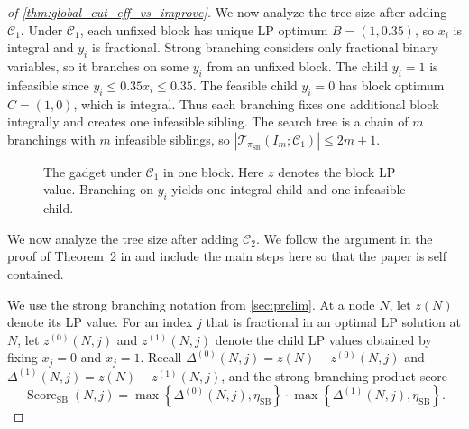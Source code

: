 \documentclass[smallextended,envcountsect]{svjour3} %
\newcommand{\set}[1]{\left\{#1\right\}}
\newcommand{\Tcal}{\mathcal{T}}
\newcommand{\Ccal}{\mathcal{C}}
\newcommand{\0}{\mathbf{0}}
\DeclareMathOperator{\Score}{Score} %
\newcommand{\1}{\mathbf{1}} %
\begin{document}
\begin{proof}[of \cref{thm:global_cut_eff_vs_improve}]
	We now analyze the tree size after adding $\Ccal_1$.
	Under $\Ccal_1$, each unfixed block has unique LP optimum $B=(1,0.35)$, so $x_i$ is integral and $y_i$ is fractional.
	Strong branching considers only fractional binary variables, so it branches on some $y_i$ from an unfixed block.
	The child $y_i=1$ is infeasible since $y_i\le 0.35x_i\le 0.35$.
	The feasible child $y_i=0$ has block optimum $C=(1,0)$, which is integral.
	Thus each branching fixes one additional block integrally and creates one infeasible sibling.
	The search tree is a chain of $m$ branchings with $m$ infeasible siblings, so $|\Tcal_{\pi_{\mathrm{SB}}}(I_m;\Ccal_1)|\le 2m+1$.

	\begin{figure}[htbp]
		\centering
			\caption{The gadget under $\Ccal_1$ in one block. Here $z$ denotes the block LP value. Branching on $y_i$ yields one integral child and one infeasible child.}
			\label{fig:fb_one_level_gadget}
		\end{figure}

	We now analyze the tree size after adding $\Ccal_2$.
	We follow the argument in the proof of Theorem~2 in \citet{shah2025non} and include the main steps here so that the paper is self contained.

	We use the strong branching notation from \cref{sec:prelim}.
	At a node $N$, let $z(N)$ denote its LP value.
	For an index $j$ that is fractional in an optimal LP solution at $N$, let $z^{(0)}(N,j)$ and $z^{(1)}(N,j)$ denote the child LP values obtained by fixing $x_j=0$ and $x_j=1$.
	Recall $\Delta^{(0)}(N,j)=z(N)-z^{(0)}(N,j)$ and $\Delta^{(1)}(N,j)=z(N)-z^{(1)}(N,j)$, and the strong branching product score
	\[
		\Score_{\mathrm{SB}}(N,j)=\max\set{\Delta^{(0)}(N,j),\eta_{\mathrm{SB}}}\cdot \max\set{\Delta^{(1)}(N,j),\eta_{\mathrm{SB}}}.
	\]


\end{proof}
\end{document}
